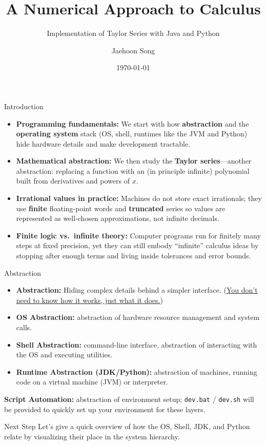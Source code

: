 \documentclass{beamer}
\title{A Numerical Approach to Calculus}
\subtitle{Implementation of Taylor Series with Java and Python}
\author{Jaehoon Song}
\date{\today}
\begin{document}
\begin{frame}
  \titlepage
\end{frame}

\begin{frame}{Introduction}
  \begin{itemize}
    \item \textbf{Programming fundamentals:} We start with how \textbf{abstraction} and the \textbf{operating system} stack (OS, shell, runtimes like the JVM and Python) hide hardware details and make development tractable.
    \item \textbf{Mathematical abstraction:} We then study the \textbf{Taylor series}---another abstraction: replacing a function with an (in principle infinite) polynomial built from derivatives and powers of $x$.
    \item \textbf{Irrational values in practice:} Machines do not store exact irrationals; they use \textbf{finite} floating-point words and \textbf{truncated} series so values are represented as well-chosen approximations, not infinite decimals.
    \item \textbf{Finite logic vs.\ infinite theory:} Computer programs run for finitely many steps at fixed precision, yet they can still embody ``infinite'' calculus ideas by stopping after enough terms and living inside tolerances and error bounds.
  \end{itemize}
\end{frame}

\begin{frame}{Abstraction}
  \begin{itemize}
    \item \textbf{Abstraction:} Hiding complex details behind a simpler interface. (\uline{You don't need to know how it works, just what it does.})
    \item \textbf{OS Abstraction:} abstraction of hardware resource management and system calls.
    \item \textbf{Shell Abstraction:} command-line interface, abstraction of interacting with the OS and executing utilities.
    \item \textbf{Runtime Abstraction (JDK/Python):} abstraction of machines, running code on a virtual machine (JVM) or interpreter.
  \end{itemize}
  \vspace{0.3cm}
  \begin{footnotesize}
    \textbf{Script Automation:} abstraction of environment setup; \texttt{dev.bat} / \texttt{dev.sh} will be provided to quickly set up your environment for these layers.
  \end{footnotesize}
  \vspace{0.3cm}
  \begin{alertblock}{Next Step}
    Let's give a quick overview of how the OS, Shell, JDK, and Python relate by visualizing their place in the system hierarchy.
  \end{alertblock}
\end{frame}
\end{document}
